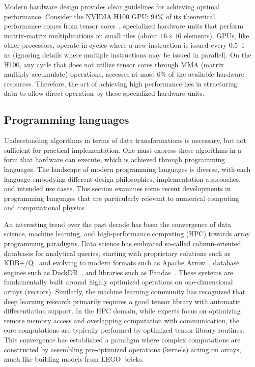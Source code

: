 Modern hardware design provides clear guidelines for achieving optimal performance. Consider the NVIDIA H100 GPU: 94\% of its theoretical performance comes from tensor cores~, specialized hardware units that perform matrix-matrix multiplications on small tiles (about $16\times 16$ elements). GPUs, like other processors, operate in cycles where a new instruction is issued every 0.5--1 ns (ignoring details where multiple instructions may be issued in parallel). On the H100, any cycle that does not utilize tensor cores through MMA (matrix multiply-accumulate) operations, accesses at most 6\% of the available hardware resources. Therefore, the art of achieving high performance lies in structuring data to allow direct operation by these specialized hardware units.

\subsection{Programming languages}

Understanding algorithms in terms of data transformations is necessary, but not sufficient for practical implementation. One must express these algorithms in a form that hardware can execute, which is achieved through programming languages. The landscape of modern programming languages is diverse, with each language embodying different design philosophies, implementation approaches, and intended use cases. This section examines some recent developments in programming languages that are particularly relevant to numerical computing and computational physics.

An interesting trend over the past decade has been the convergence of data science, machine learning, and high-performance computing (HPC) towards array programming paradigms. Data science has embraced so-called column-oriented databases for analytical queries, starting with proprietary solutions such as KDB+/Q~ and evolving to modern formats such as Apache Arrow~, database engines such as DuckDB~, and libraries such as Pandas~\cite{reback2020pandas,McKinn_2010_Data_Structures}. These systems are fundamentally built around highly optimized operations on one-dimensional arrays (vectors). Similarly, the machine learning community has recognized that deep learning research primarily requires a good tensor library with automatic differentiation support. In the HPC domain, while experts focus on optimizing remote memory access and overlapping computation with communication, the core computations are typically performed by optimized tensor library routines. This convergence has established a paradigm where complex computations are constructed by assembling pre-optimized operations (kernels) acting on arrays, much like building models from LEGO\textregistered\   bricks.

